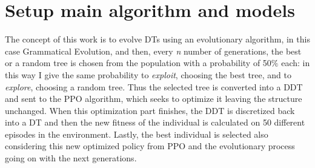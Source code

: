 \chapter{Setup main algorithm and models}
\label{cha:200}
The concept of this work is to evolve DTs using an evolutionary algorithm, in this case Grammatical Evolution, and then, every \textit{n} number of generations, the best or a random tree is chosen from the population with a probability of 50\(\%\) each: in this way I give the same probability to \textit{exploit}, choosing the best tree, and to \textit{explore}, choosing a random tree. Thus the selected tree is converted into a DDT and sent to the PPO algorithm, which seeks to optimize it leaving the structure unchanged. When this optimization part finishes, the DDT is discretized back into a DT and then the new fitness of the individual is calculated on 50 different episodes in the environment. Lastly, the best individual is selected also considering this new optimized policy from PPO and the evolutionary process going on with the next generations.



